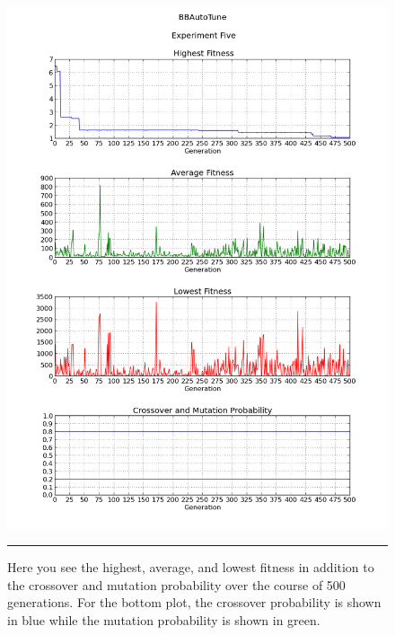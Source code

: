 \begin{figure}[htbp]
\centering
\includegraphics[width=5in]{../Figures/Chapter4/exp5_halcm.png}
\rule{35em}{0.5pt}
\caption[Experiment Five GA Metrics]{Here you see the highest, average, and lowest fitness in addition to the crossover and mutation probability over the course of 500 generations. For the bottom plot, the crossover probability is shown in blue while the mutation probability is shown in green.}
\label{fig:exp5_halcm}
\end{figure}

